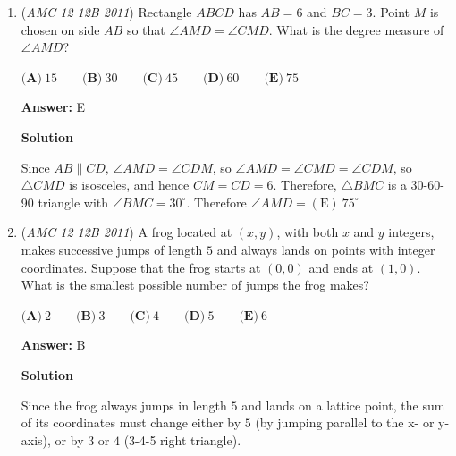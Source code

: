 \begin{enumerate}
 \textbf{Answer: }D



\textbf{Solution}

For the product to be greater than zero, we must have either both numbers negative or both positive. 

 Both numbers are negative with a $\frac{2}{3}*\frac{2}{3}=\frac{4}{9}$ chance.

 Both numbers are positive with a $\frac{1}{3}*\frac{1}{3}=\frac{1}{9}$ chance.

 Therefore, the total probability is $\frac{4}{9}+\frac{1}{9}=\frac{5}{9}$ and we are done. $\boxed{D}$



	\item (\textit{AMC 12 12B 2011}) Rectangle $ABCD$ has $AB=6$ and $BC=3$. Point $M$ is chosen on side $AB$ so that $\angle AMD=\angle CMD$. What is the degree measure of $\angle AMD$?


 $\textbf{(A)}\ 15 \qquad \textbf{(B)}\ 30 \qquad \textbf{(C)}\ 45 \qquad \textbf{(D)}\ 60 \qquad \textbf{(E)}\ 75$

 \textbf{Answer: }E



\textbf{Solution}

Since $AB \parallel CD$, $\angle AMD = \angle CDM$, so $\angle AMD = \angle CMD = \angle CDM$, so $\bigtriangleup CMD$ is isosceles, and hence $CM=CD=6$.  Therefore, $\triangle BMC$ is a 30-60-90 triangle with $\angle BMC = 30^\circ$.  Therefore $\angle AMD=\boxed{\mathrm{(E)}\ 75^\circ}$



	\item (\textit{AMC 12 12B 2011}) A frog located at $(x,y)$, with both $x$ and $y$ integers, makes successive jumps of length $5$ and always lands on points with integer coordinates. Suppose that the frog starts at $(0,0)$ and ends at $(1,0)$. What is the smallest possible number of jumps the frog makes?


 $\textbf{(A)}\ 2 \qquad \textbf{(B)}\ 3 \qquad \textbf{(C)}\ 4 \qquad \textbf{(D)}\ 5 \qquad \textbf{(E)}\ 6$

 \textbf{Answer: }B



\textbf{Solution}

Since the frog always jumps in length $5$ and lands on a lattice point, the sum of its coordinates must change either by $5$ (by jumping parallel to the x- or y-axis), or by $3$ or $4$ (3-4-5 right triangle).


\end{enumerate}
